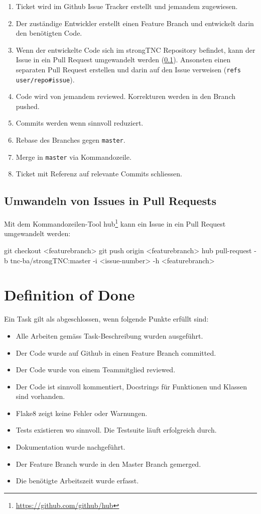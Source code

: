 \begin{enumerate}
	\item Ticket wird im Github Issue Tracker erstellt und jemandem zugewiesen.
	\item Der zuständige Entwickler erstellt einen Feature Branch und entwickelt
		darin den benötigten Code.
	\item Wenn der entwickelte Code sich im strongTNC Repository befindet, kann
		der Issue in ein Pull Request umgewandelt werden (\ref{workflow:hub}).
		Ansonsten einen separaten Pull Request erstellen und darin auf den Issue
		verweisen (\texttt{refs user/repo\#issue}).
	\item Code wird von jemandem reviewed. Korrekturen werden in den Branch
		pushed.
	\item Commits werden wenn sinnvoll reduziert.
	\item Rebase des Branches gegen \texttt{master}.
	\item Merge in \texttt{master} via Kommandozeile.
	\item Ticket mit Referenz auf relevante Commits schliessen.
\end{enumerate}

\subsection{Umwandeln von Issues in Pull Requests}
\label{workflow:hub}

Mit dem Kommandozeilen-Tool hub\footnote{\url{https://github.com/github/hub}}
kann ein Issue in ein Pull Request umgewandelt werden:

\begin{bashcode}
git checkout <featurebranch>
git push origin <featurebranch>
hub pull-request -b tnc-ba/strongTNC:master -i <issue-number> -h <featurebranch>
\end{bashcode}


\section{Definition of Done}
\label{DefinitionOfDone}

Ein Task gilt als abgeschlossen, wenn folgende Punkte erfüllt sind:

\begin{itemize}
	\item Alle Arbeiten gemäss Task-Beschreibung wurden ausgeführt.
	\item Der Code wurde auf Github in einen Feature Branch committed.
	\item Der Code wurde von einem Teammitglied reviewed.
	\item Der Code ist sinnvoll kommentiert, Docstrings für Funktionen und Klassen sind vorhanden.
	\item Flake8 zeigt keine Fehler oder Warnungen.
	\item Tests existieren wo sinnvoll. Die Testsuite läuft erfolgreich durch.
	\item Dokumentation wurde nachgeführt.
	\item Der Feature Branch wurde in den Master Branch gemerged.
	\item Die benötigte Arbeitszeit wurde erfasst.
\end{itemize}

